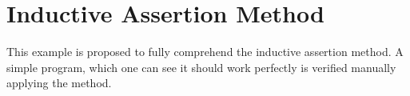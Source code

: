 
%

\chapter{Inductive Assertion Method}

This example is proposed to fully comprehend the inductive assertion method. 
%
A simple program, which one can see it should work perfectly is verified manually applying the method.
\label{app:exampleFactorial}
\begin{example}

\end{example}



